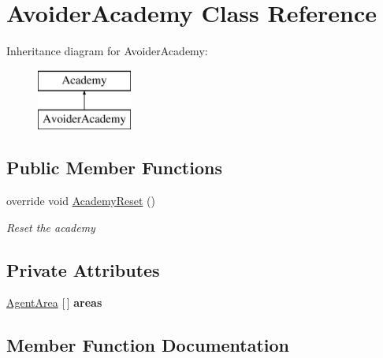 \hypertarget{class_avoider_academy}{}\section{Avoider\+Academy Class Reference}
\label{class_avoider_academy}
Inheritance diagram for Avoider\+Academy\+:\begin{figure}[H]
\begin{center}
\leavevmode
\includegraphics[height=2.000000cm]{class_avoider_academy}
\end{center}
\end{figure}
\subsection*{Public Member Functions}
\begin{DoxyCompactItemize}
\item 
override void \mbox{\hyperlink{class_avoider_academy_ade081759a0abf7586e2b8b6da2d86a74}{Academy\+Reset}} ()
\begin{DoxyCompactList}\small\item\em Reset the academy \end{DoxyCompactList}\end{DoxyCompactItemize}
\subsection*{Private Attributes}
\begin{DoxyCompactItemize}
\item 
\mbox{\label{class_avoider_academy_a950c3a207f823382ec97fafa6c141f92}} 
\mbox{\hyperlink{class_agent_area}{Agent\+Area}} \mbox{[}$\,$\mbox{]} {\bfseries areas}
\end{DoxyCompactItemize}


\subsection{Member Function Documentation}
\mbox{\label{class_avoider_academy_ade081759a0abf7586e2b8b6da2d86a74}} 
